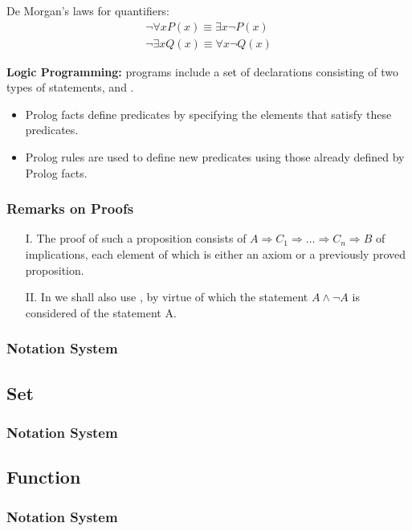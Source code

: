 De Morgan's laws for quantifiers:
\begin{align*}
  \neg{\forall{x}P(x)} \equiv \exists{x}\neg{P(x)} \\
  \neg{\exists{x}Q(x)} \equiv \forall{x}\neg{Q(x)}
\end{align*}

\textbf{Logic Programming:}  programs include a set of 
declarations consisting of two types of statements, 
and .
\begin{itemize}
  \item Prolog facts define predicates by specifying the elements that satisfy 
    these predicates.
  \item Prolog rules are used to define new predicates using those already 
    defined by Prolog facts.
\end{itemize}


\crule

\subsubsection{Remarks on Proofs} 

\begin{itemize}
  \item[I.] The proof of such a proposition consists of 
    $A \Rightarrow C_1 \Rightarrow \dots \Rightarrow C_n \Rightarrow B$
    of implications, each element of which is either an axiom or 
    a previously proved proposition.
  \item[II.] In  we shall also use 
    , by virtue of which the statement
    $A \wedge \neg{A}$ is considered  of the statement A.
\end{itemize}

\crule

\subsubsection{Notation System}

\subsection{Set}

\subsubsection{Notation System}

\subsection{Function}

\subsubsection{Notation System}
